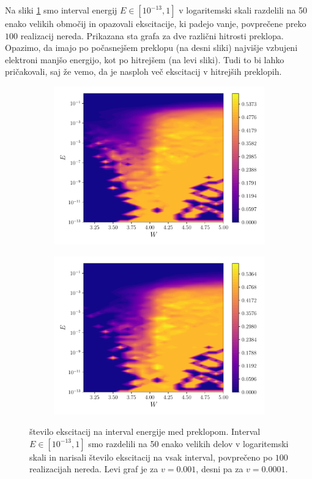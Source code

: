 Na sliki \ref{fig:EksBini2} smo interval energij $E \in [10^{-13},1]$ v logaritemski skali razdelili na 50 enako velikih območij in opazovali ekscitacije, ki padejo vanje, povprečene preko $100$ realizacij nereda. Prikazana sta grafa za dve različni hitrosti preklopa. Opazimo, da imajo po počasnejšem preklopu (na desni sliki) najvišje vzbujeni elektroni manjšo energijo, kot po hitrejšem (na levi sliki). Tudi to bi lahko pričakovali, saj že vemo, da je nasploh več ekscitacij v hitrejših preklopih.
\begin{figure}[!h]
\centering
\begin{subfigure}{.49\textwidth}
\includegraphics[width=\linewidth]{Figures/EksBini3.pdf}
\end{subfigure}
\begin{subfigure}{.49\textwidth}
\includegraphics[width=\linewidth]{Figures/EksBini4.pdf}
\end{subfigure}
\caption{število ekscitacij na interval energije med preklopom. Interval $E \in [10^{-13},1]$ smo razdelili na 50 enako velikih delov v logaritemski skali in narisali število ekscitacij na vsak interval, povprečeno po $100$ realizacijah nereda. Levi graf je za $v=0.001$, desni pa za $v=0.0001$.}
\label{fig:EksBini2}
\end{figure}
